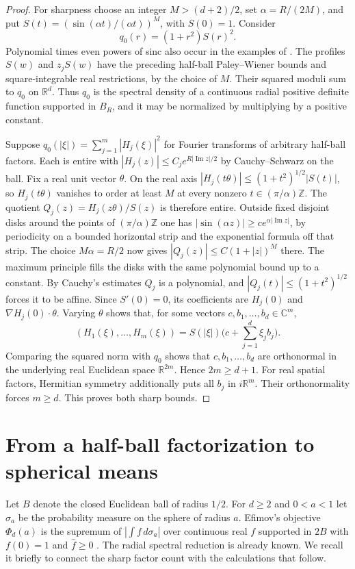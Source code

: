 \documentclass[11pt,a4paper]{article}
\numberwithin{equation}{section}
\begin{document}
\begin{proof}
For sharpness choose an integer $M>(d+2)/2$, set $\alpha=R/(2M)$, and put $S(t)=(\sin(\alpha t)/(\alpha t))^M$, with $S(0)=1$. Consider
\[
 q_0(r)=(1+r^2)S(r)^2 .
\]
Polynomial times even powers of sinc also occur in the examples of \cite[eq.~(18)]{EGR}. The profiles $S(w)$ and $z_jS(w)$ have the preceding half-ball Paley--Wiener bounds and square-integrable real restrictions, by the choice of $M$. Their squared moduli sum to $q_0$ on $\mathbb R^d$. Thus $q_0$ is the spectral density of a continuous radial positive definite function supported in $B_R$, and it may be normalized by multiplying by a positive constant.

Suppose $q_0(|\xi|)=\sum_{j=1}^m|H_j(\xi)|^2$ for Fourier transforms of arbitrary half-ball factors. Each is entire with $|H_j(z)|\le C_j e^{R|\operatorname{Im}z|/2}$ by Cauchy--Schwarz on the ball. Fix a real unit vector $\theta$. On the real axis $|H_j(t\theta)|\le (1+t^2)^{1/2}|S(t)|$, so $H_j(t\theta)$ vanishes to order at least $M$ at every nonzero $t\in(\pi/\alpha)\mathbb Z$. The quotient $Q_j(z)=H_j(z\theta)/S(z)$ is therefore entire. Outside fixed disjoint disks around the points of $(\pi/\alpha)\mathbb Z$ one has $|\sin(\alpha z)|\ge c e^{\alpha|\operatorname{Im}z|}$, by periodicity on a bounded horizontal strip and the exponential formula off that strip. The choice $M\alpha=R/2$ now gives $|Q_j(z)|\le C(1+|z|)^M$ there. The maximum principle fills the disks with the same polynomial bound up to a constant. By Cauchy's estimates $Q_j$ is a polynomial, and $|Q_j(t)|\le(1+t^2)^{1/2}$ forces it to be affine. Since $S'(0)=0$, its coefficients are $H_j(0)$ and $\nabla H_j(0)\cdot\theta$. Varying $\theta$ shows that, for some vectors $c,b_1,\ldots,b_d\in\mathbb C^m$,
\[
 (H_1(\xi),\ldots,H_m(\xi))=S(|\xi|)\biggl(c+\sum_{j=1}^d\xi_j b_j\biggr).
\]
Comparing the squared norm with $q_0$ shows that $c,b_1,\ldots,b_d$ are orthonormal in the underlying real Euclidean space $\mathbb R^{2m}$. Hence $2m\ge d+1$. For real spatial factors, Hermitian symmetry additionally puts all $b_j$ in $i\mathbb R^m$. Their orthonormality forces $m\ge d$. This proves both sharp bounds.
\end{proof}

\section{From a half-ball factorization to spherical means}
\label{sec:sered}
Let $B$ denote the closed Euclidean ball of radius $1/2$. For $d\ge2$ and $0<a<1$ let $\sigma_a$ be the probability measure on the sphere of radius $a$. Efimov's objective $\Phi_d(a)$ is the supremum of $|\int f\,d\sigma_a|$ over continuous real $f$ supported in $2B$ with $f(0)=1$ and $\widehat f\ge0$ \cite{EfimovSphere,GM}. The radial spectral reduction is already known. We recall it briefly to connect the sharp factor count with the calculations that follow.
\end{document}
